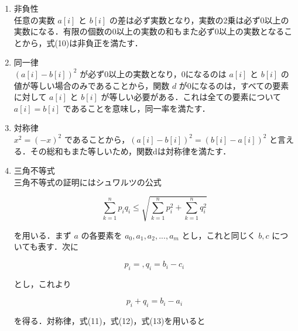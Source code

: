 \begin{enumerate}
    \item 非負性 \\
    任意の実数 $ a[i] $ と $ b[i] $ の差は必ず実数となり，実数の2乗は必ず0以上の実数になる．有限の個数の0以上の実数の和もまた必ず0以上の実数となることから，式(10)は非負正を満たす．

    \item 同一律 \\
    $ (a[i] - b[i])^2 $ が必ず0以上の実数となり，0になるのは $ a[i] $ と $ b[i] $ の値が等しい場合のみであることから，関数 $ d $ が0になるのは，すべての要素に対して $ a[i] $ と $ b[i] $ が等しい必要がある．これは全ての要素について $ a[i] = b[i] $ であることを意味し，同一率を満たす．

    \item 対称律 \\
    $ x^2 = (-x)^2 $ であることから，$ (a[i] - b[i])^2 = (b[i] - a[i])^2 $ と言える．その総和もまた等しいため，関数dは対称律を満たす．

    \item 三角不等式 \\
    三角不等式の証明にはシュワルツの公式

    \begin{equation}
        \sum_{k=1}^n p_iq_i \leq \sqrt{\sum_{k=1}^n p_i^2 + \sum_{k=1}^n q_i^2}
    \end{equation}

    を用いる．まず $ a $ の各要素を $ a_0, a_1, a_2, ..., a_m $ とし，これと同じく $ b, c $ についても表す．次に

    \begin{equation}
        p_i = , q_i = b_i - c_i
    \end{equation}

    とし，これより

    \begin{equation}
        p_i + q_i = b_i - a_i
    \end{equation}

    を得る．対称律，式(11)，式(12)，式(13)を用いると


\end{enumerate}

